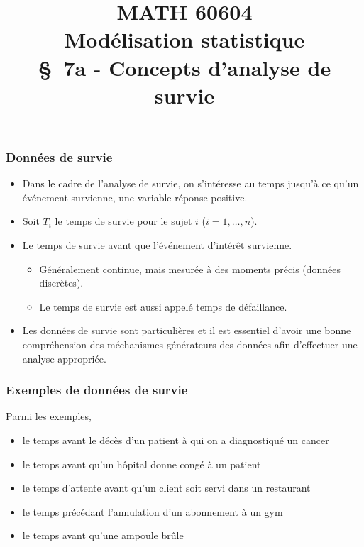 \documentclass{beamer}
\title[\color{white}{MATH 60604 \S~7a - Concepts d'analyse de survie}]{\texorpdfstring{MATH 60604 \\Modélisation statistique \\ \S~7a - Concepts d'analyse de survie}{MATH 60604 \\ Modélisation statistique \\ \S~7a - Concepts d'analyse de survie}}
\author{}
\institute{HEC Montréal\\
Département de sciences de la décision}
\date{}
\begin{document}
\frame{\titlepage}
\begin{frame}
\frametitle{Données de survie}
\begin{itemize}
\vp \vp
\item Dans le cadre de \alert{l'analyse de survie}, on s'intéresse au temps jusqu'à ce qu'un événement survienne, une variable réponse positive.
\item Soit $T_i$ le \alert{temps de survie} pour le sujet $i$ ($i=1, \ldots, n$). 
\item Le temps de survie avant que l'événement d'intérêt survienne. 
\begin{itemize}
\vp \vp
\item Généralement continue, mais mesurée à des moments précis (données discrètes).
\item Le temps de survie est aussi appelé \alert{temps de défaillance}.
\end{itemize}
\item Les données de survie sont particulières et il est essentiel d'avoir une bonne compréhension des méchanismes générateurs des données afin d'effectuer une analyse appropriée. 
\end{itemize}
\end{frame}
\begin{frame}
\frametitle{Exemples de données de survie}
Parmi les exemples, 
\begin{itemize}
\vp \vp
\item le temps avant le décès d'un patient à qui on a diagnostiqué un cancer 
\item le temps avant qu'un hôpital donne congé à un patient 
\item le temps d'attente avant qu'un client soit servi dans un restaurant
\item le temps précédant l'annulation d'un abonnement à un gym
\item le temps avant qu'une ampoule brûle
\end{itemize}
\end{frame}
\end{document}
